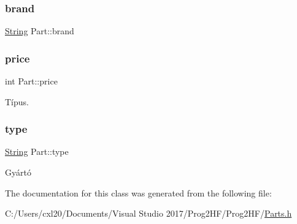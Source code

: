 \subsubsection{\texorpdfstring{brand}{brand}}
{\footnotesize\ttfamily \mbox{\hyperlink{class_string}{String}} Part\+::brand\hspace{0.3cm}{\ttfamily [protected]}}

\mbox{\label{class_part_a8e71223aed1da95a974f33d8d6c91bb1}} 
\subsubsection{\texorpdfstring{price}{price}}
{\footnotesize\ttfamily int Part\+::price\hspace{0.3cm}{\ttfamily [protected]}}



Típus. 

\mbox{\label{class_part_a101dbcc5c4b21564df7414c7eb0eae88}} 
\subsubsection{\texorpdfstring{type}{type}}
{\footnotesize\ttfamily \mbox{\hyperlink{class_string}{String}} Part\+::type\hspace{0.3cm}{\ttfamily [protected]}}



Gyártó 



The documentation for this class was generated from the following file\+:\begin{DoxyCompactItemize}
\item 
C\+:/\+Users/cxl20/\+Documents/\+Visual Studio 2017/\+Prog2\+H\+F/\+Prog2\+H\+F/\mbox{\hyperlink{_parts_8h}{Parts.\+h}}\end{DoxyCompactItemize}
